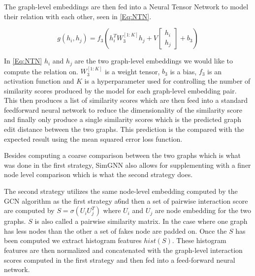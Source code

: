 The graph-level embeddings are then fed into a Neural Tensor Network to model their relation with each other, seen in \autoref{Eq:NTN}.


\begin{equation}\label{Eq:NTN}
g(h_i,h_j) = f_3(h_i^TW_3^{[1:K]}h_j+V\begin{bmatrix}h_i \\ h_j \end{bmatrix} + b_3)
\end{equation}

In \autoref{Eq:NTN} $h_i$ and $h_j$ are the two graph-level embeddings we would like to compute the relation on. $W_3^{[1:K]}$ is a weight tensor, $b_3$ is a bias,  $f_3$ is an activation function and $K$ is a hyperparameter used for controlling the number of similarity scores produced by the model for each graph-level embedding pair\cite{Bai2018}. This then produces a list of similarity scores which are then feed into a standard feedforward neural network to reduce the dimensionality of the similarity score and finally only produce a single similarity scores which is the predicted graph edit distance between the two graphs. This prediction is the compared with the expected result using the mean squared error loss function\cite{Bai2018}.


Besides computing a coarse comparison between the two graphs which is what was done in the first strategy, SimGNN also allows for supplementing with a finer node level comparison which is what the second strategy does.

The second strategy utilizes the same node-level embedding computed by the GCN algorithm as the first strategy a6nd then a set of pairwise interaction score are computed by $S = \sigma(U_iU_j^T)$ where $U_i$ and $U_j$ are node embedding for the two graphs. $S$ is also called a pairwise similarity matrix. In the case where one graph has less nodes than the other a set of fakes node are padded on. Once the $S$ has been computed we extract histogram features $hist(S)$. These histogram features are then normalized and concatenated with the graph-level interaction scores computed in the first strategy and then fed into a feed-forward neural network\cite{Bai2018}.




